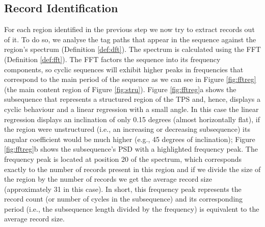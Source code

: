 \documentclass{vldb}
\begin{document}
\subsection{Record Identification}\label{ss:reci}

For each region identified in the previous step we now try to extract records
out of it. To do so, we analyse the tag paths that appear in the sequence
against the region's spectrum (Definition \ref{def:dft}). The spectrum is
calculated using the FFT\cite{fft1965} (Definition \ref{def:fft}).
The FFT factors the sequence into its frequency components, so
cyclic sequences will exhibit higher peaks in frequencies that correspond to the
main period of the sequence as we can see in Figure \ref{fig:fftreg} (the main
content region of Figure \ref{fig:stru}). Figure \ref{fig:fftreg}a shows the
subsequence that represents a structured region of the TPS and, hence, displays
a cyclic behaviour and a linear regression with a small angle. In this case the
linear regression displays an inclination of only 0.15 degrees (almost
horizontally flat), if the region were unstructured (i.e., an increasing or
decreasing subsequence) its angular coefficient would be much higher (e.g., 45
degrees of inclination); Figure \ref{fig:fftreg}b shows the subsequence's PSD
with a highlighted frequency peak. The frequency peak is located at position 20
of the spectrum, which corresponds exactly to the number of records present in
this region and if we divide the size of the region by the number of records we
get the average record size (approximately 31 in this case).
In short, this frequency peak represents the record count (or number of cycles
in the subsequence) and its corresponding period (i.e., the subsequence length
divided by the frequency) is equivalent to the average record size.
\end{document}
